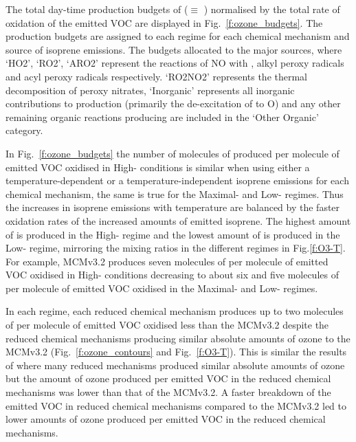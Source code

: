 The total day-time production budgets of  ($\equiv$ ) normalised by the total rate of oxidation of the emitted VOC are displayed in Fig.~\ref{f:ozone_budgets}.
The  production budgets are assigned to each  regime for each chemical mechanism and source of isoprene emissions.
The budgets allocated to the major sources, where `HO2', `RO2', `ARO2' represent the reactions of NO with , alkyl peroxy radicals and acyl peroxy radicals respectively.
`RO2NO2' represents the thermal decomposition of peroxy nitrates, `Inorganic' represents all inorganic contributions to  production (primarily the de-excitation of  to O) and any other remaining organic reactions producing  are included in the `Other Organic' category.

In Fig.~\ref{f:ozone_budgets} the number of molecules of  produced per molecule of emitted VOC oxidised in High- conditions is similar when using either a temperature-dependent or a temperature-independent isoprene emissions for each chemical mechanism, the same is true for the Maximal- and Low- regimes.
Thus the increases in isoprene emissions with temperature are balanced by the faster oxidation rates of the increased amounts of emitted isoprene.
The highest amount of  is produced in the High- regime and the lowest amount of  is produced in the Low- regime, mirroring the  mixing ratios in the different  regimes in Fig.\ref{f:O3-T}.
For example, MCMv3.2 produces seven molecules of  per molecule of emitted VOC oxidised in High- conditions decreasing to about six and five molecules of  per molecule of emitted VOC oxidised in the Maximal- and Low- regimes.

In each  regime, each reduced chemical mechanism produces up to two molecules of  per molecule of emitted VOC oxidised less than the MCMv3.2 despite the reduced chemical mechanisms producing similar absolute amounts of ozone to the MCMv3.2 (Fig.~\ref{f:ozone_contours} and Fig.~\ref{f:O3-T}).
This is similar the results of \citet{Coates:2015} where many reduced mechanisms produced similar absolute amounts of ozone but the amount of ozone produced per emitted VOC in the reduced chemical mechanisms was lower than that of the MCMv3.2.
A faster breakdown of the emitted VOC in reduced chemical mechanisms compared to the MCMv3.2 led to lower amounts of ozone produced per emitted VOC in the reduced chemical mechanisms.

